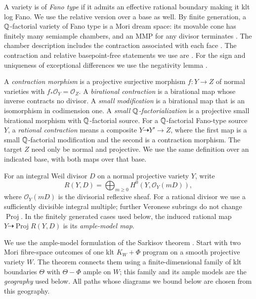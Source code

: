 A variety is of \emph{Fano type} if it admits an effective rational
boundary making it klt log Fano.  We use the relative version over a
base as well.  By finite generation, a $\mathbb Q$-factorial variety of Fano
type is a Mori dream space: its movable cone has finitely many
semiample chambers, and an MMP for any divisor terminates
\cite[Corollary~1.3.2]{BCHM10}.  The chamber description includes
the contraction associated with each face
\cite[Proposition~1.11]{HuKeel00}.
The contraction and relative basepoint-free statements we use are
\cite[Theorem~4.5.2 and Corollary~6.9.4]{FujinoFoundationsDraft057}.
For the sign and uniqueness of exceptional differences we use the
negativity lemma \cite[Lemma~11.60]{KollarFamiliesDraft057}.

A \emph{contraction morphism} is a projective surjective morphism
$f:Y\to Z$ of normal varieties with $f_*\mathcal O_Y=\mathcal O_Z$.
A \emph{birational contraction} is a birational map whose inverse
contracts no divisor.
A \emph{small modification} is a birational map that is an isomorphism
in codimension one. A \emph{small $\mathbb Q$-factorialization} is a projective
small birational morphism with $\mathbb Q$-factorial source.
For a $\mathbb Q$-factorial Fano-type source $Y$, a
\emph{rational contraction} means a composite
$Y\dashrightarrow Y'\to Z$, where the first map is a small
$\mathbb Q$-factorial modification and the second is a contraction morphism.
The target $Z$ need only be normal and projective. We use the same
definition over an indicated base, with both maps over that base.

For an integral Weil divisor $D$ on a normal projective variety $Y$,
write
\[
 R(Y,D)=\bigoplus_{m\geq0}H^0(Y,\mathcal O_Y(mD)),
\]
where $\mathcal O_Y(mD)$ is the divisorial reflexive sheaf. For a
rational divisor we use a sufficiently divisible integral multiple;
further Veronese subrings do not change $\operatorname{Proj}$. In
the finitely generated cases used below, the induced rational map
$Y\dashrightarrow\operatorname{Proj}R(Y,D)$ is its \emph{ample-model map}.

We use the ample-model formulation of the Sarkisov theorem
\cite[Theorem~1.3, Theorem~3.3, Theorem~3.7, and Lemma~4.1]{HM13}.
Start with two Mori fibre-space outcomes of one klt $K_W+\Phi$
program on a smooth projective variety $W$. The theorem connects
them using a finite-dimensional family of klt boundaries $\Theta$
with $\Theta-\Phi$ ample on $W$; this family and its ample models
are the \emph{geography} used below.
All paths whose diagrams we bound below are chosen from this geography.

